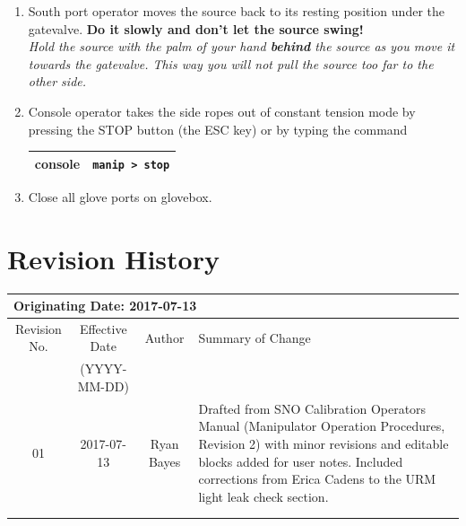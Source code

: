 \documentclass[11pt]{article}
\begin{document}
\begin{enumerate}
\item \CheckBox[name=dsr16]{} South port operator moves the source back to its resting position under the gatevalve. {\bf Do it slowly and don't let the source swing!}\\ {\it Hold the source with the palm of your hand {\bf behind} the source as you move it towards the gatevalve. This way you will not pull the source too far to the other side.}
\item \CheckBox[name=dsr17]{} Console operator takes the side ropes out of constant tension mode by pressing the STOP button (the ESC key) or by typing the command
\begin{center}
\begin{tabular}{|c|c|}
\hline
console & \verb+manip > stop+\\
\hline
\end{tabular}
\end{center}
\item \CheckBox[name=dsr18]{} Close all glove ports on glovebox.
\end{enumerate}

\section{Revision History}
\begin{tabular}{|c|c|c|p{6cm}|}
\hline\hline
\multicolumn{4}{|l|}{Originating Date: 2017-07-13}\\
\hline
Revision No. & Effective Date & Author & Summary of Change \\
& (YYYY-MM-DD) & & \\
\hline
01 & 2017-07-13 & Ryan Bayes & Drafted from SNO Calibration Operators Manual (Manipulator Operation Procedures, Revision 2) with minor revisions and editable blocks added for user notes. Included corrections from Erica Cadens to the URM light leak check section. \\
\hline
& & & \\
\hline
& & & \\
\hline \hline

\end{tabular}
\end{document}
